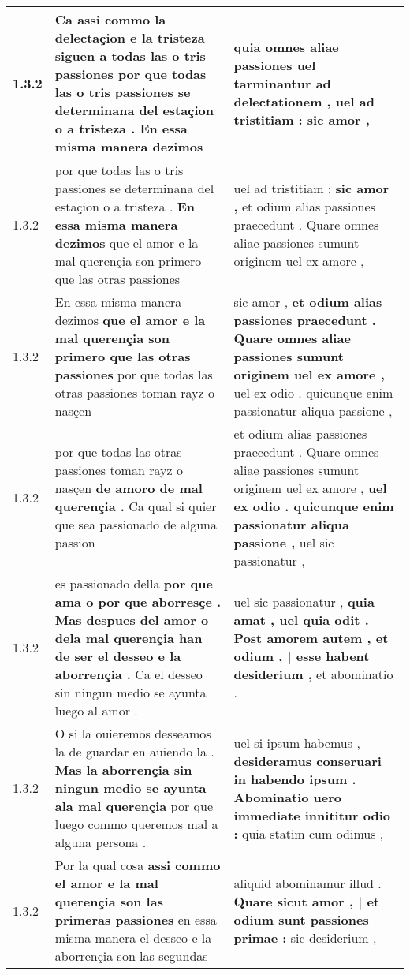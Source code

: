 \begin{tabular}{|p{1cm}|p{6.5cm}|p{6.5cm}|}
1.3.2 & Ca assi commo la delectaçion e la tristeza siguen a todas las o tris passiones \textbf{ por que todas las o tris passiones se determinana del estaçion o a tristeza . } En essa misma manera dezimos & quia omnes aliae passiones uel tarminantur ad delectationem , \textbf{ uel ad tristitiam : } sic amor , \\\hline
1.3.2 & por que todas las o tris passiones se determinana del estaçion o a tristeza . \textbf{ En essa misma manera dezimos } que el amor e la mal querençia son primero que las otras passiones & uel ad tristitiam : \textbf{ sic amor , } et odium alias passiones praecedunt . Quare omnes aliae passiones sumunt originem uel ex amore , \\\hline
1.3.2 & En essa misma manera dezimos \textbf{ que el amor e la mal querençia son primero que las otras passiones } por que todas las otras passiones toman rayz o nasçen & sic amor , \textbf{ et odium alias passiones praecedunt . Quare omnes aliae passiones sumunt originem uel ex amore , } uel ex odio . quicunque enim passionatur aliqua passione , \\\hline
1.3.2 & por que todas las otras passiones toman rayz o nasçen \textbf{ de amoro de mal querençia . } Ca qual si quier que sea passionado de alguna passion & et odium alias passiones praecedunt . Quare omnes aliae passiones sumunt originem uel ex amore , \textbf{ uel ex odio . quicunque enim passionatur aliqua passione , } uel sic passionatur , \\\hline
1.3.2 & es passionado della \textbf{ por que ama o por que aborresçe . Mas despues del amor o dela mal querençia han de ser el desseo e la aborrençia . } Ca el desseo sin ningun medio se ayunta luego al amor . & uel sic passionatur , \textbf{ quia amat , uel quia odit . Post amorem autem , et odium , | esse habent desiderium , } et abominatio . \\\hline
1.3.2 & O si la ouieremos desseamos la de guardar en auiendo la . \textbf{ Mas la aborrençia sin ningun medio se ayunta ala mal querençia } por que luego commo queremos mal a alguna persona . & uel si ipsum habemus , \textbf{ desideramus conseruari in habendo ipsum . Abominatio uero immediate innititur odio : } quia statim cum odimus , \\\hline
1.3.2 & Por la qual cosa \textbf{ assi commo el amor e la mal querençia son las primeras passiones } en essa misma manera el desseo e la aborrençia son las segundas & aliquid abominamur illud . \textbf{ Quare sicut amor , | et odium sunt passiones primae : } sic desiderium , \\\hline

\end{tabular}
